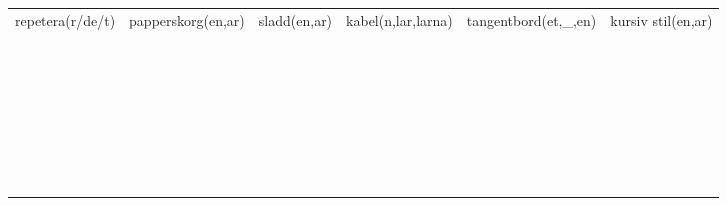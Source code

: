 \begin{center}
\begin{adjustwidth}{-2.5cm}{}
\begin{tabular}{|c c c c c c|}
            repetera(r/de/t) & papperskorg(en,ar) & sladd(en,ar) & kabel(n,lar,larna) & tangentbord(et,\_,en) & kursiv stil(en,ar) \\
             &  &  &  &  &  \\
             &  &  &  &  &  \\
             &  &  &  &  &  \\
             &  &  &  &  &  \\
             &  &  &  &  &  \\
             &  &  &  &  &  \\
             &  &  &  &  &  \\
             &  &  &  &  &  \\
             &  &  &  &  &  \\
             &  &  &  &  &  \\
             &  &  &  &  &  \\
             &  &  &  &  &  \\
             &  &  &  &  &  \\
             &  &  &  &  &  \\
             &  &  &  &  &  \\
             &  &  &  &  &  \\
             &  &  &  &  &  \\
             &  &  &  &  &  \\
             &  &  &  &  &  \\
             &  &  &  &  &  \\
             &  &  &  &  &  \\
             &  &  &  &  &  \\
             &  &  &  &  &  \\
             &  &  &  &  &  \\
             &  &  &  &  &  \\
             &  &  &  &  &  \\
             &  &  &  &  &  \\
             &  &  &  &  &  \\
             &  &  &  &  &  \\
             &  &  &  &  &  \\
             &  &  &  &  &  \\
            \hline
        \end{tabular}
    \end{adjustwidth}
\end{center}

